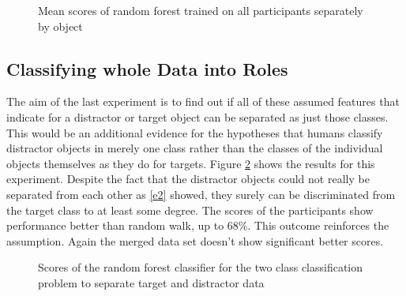 \begin{figure}[H]
	\caption{Mean scores of random forest trained on all participants separately by object}
	\label{tnt}
\end{figure}

\subsection{Classifying whole Data into Roles}
The aim of the last experiment is to find out if all of these assumed features that indicate for a distractor or target object can be separated as just those classes. This would be an additional evidence for the hypotheses that humans classify distractor objects in merely one class rather than the classes of the individual objects themselves as they do for targets. Figure \ref{tvd} shows the results for this experiment. Despite the fact that the distractor objects could not really be separated from each other as \ref{e2} showed, they surely can be discriminated from the target class to at least some degree. The scores of the participants show performance better than random walk, up to 68\%. This outcome reinforces the assumption. Again the merged data set doesn't show significant better scores.

\begin{figure}[H]
	\caption{Scores of the random forest classifier for the two class classification problem to separate target and distractor data}
	\label{tvd}
\end{figure}